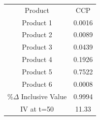 \begin{tabular}{cc}
Product & CCP \\
Product 1 & 0.0016 \\
Product 2 & 0.0089 \\
Product 3 & 0.0439 \\
Product 4 & 0.1926 \\
Product 5 & 0.7522 \\
Product 6 & 0.0008 \\
$\%\Delta$ Inclusive Value & 0.9994 \\
IV at t=50 & 11.33 \\
\end{tabular}